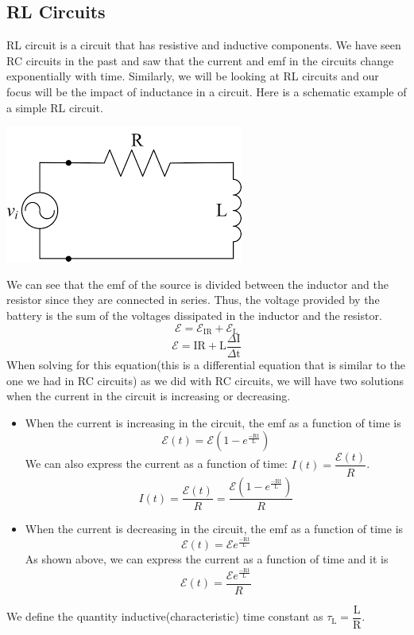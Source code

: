\documentclass[9pt]{article}
\begin{document}
	\subsection*{RL Circuits}
	RL circuit is a circuit that has resistive and inductive components. We have seen RC circuits in the past and saw that the current and emf in the circuits change exponentially with time. Similarly, we will be looking at RL circuits and our focus will be the impact of inductance in a circuit. Here is a schematic example of a simple RL circuit.
	\begin{center}
		\includegraphics[scale=0.5]{RL}
	\end{center}
	We can see that the emf of the source is divided between the inductor and the resistor since they are connected in series. Thus, the voltage provided by the battery is the sum of the voltages dissipated in the inductor and the resistor.
	$$\mathcal{E}=\mathcal{E}_{\text{IR}}+\mathcal{E}_{\text{L}}$$ 
	$$\mathcal{E}=\text{IR}+\text{L}\dfrac{\varDelta\text{I}}{\varDelta \text{t}}$$ 
	When solving for this equation(this is a differential equation that is similar to the one we had in RC circuits) as we did with RC circuits, we will have two solutions when the current in the circuit is increasing or decreasing.
	\begin{itemize}
		\item When the current is increasing in the circuit, the emf as a function of time is
		$$\mathcal{E}(t)=\mathcal{E}(1-e^{\frac{-\text{Rt}}{\text{L}}})$$
		We can also express the current as a function of time: $I(t)=\dfrac{\mathcal{E}(t)}{R}$.
		$$I(t)=\dfrac{\mathcal{E}(t)}{R}=\dfrac{\mathcal{E}(1-e^{\frac{-\text{Rt}}{\text{L}}})}{R}$$
		\item When the current is decreasing in the circuit, the emf as a function of time is
		$$\mathcal{E}(t)=\mathcal{E}e^{\frac{-\text{Rt}}{\text{L}}}$$
		As shown above, we can express the current as a function of time and it is
		$$\mathcal{E}(t)=\dfrac{\mathcal{E}e^{\frac{-\text{Rt}}{\text{L}}}}{R}$$
	\end{itemize}
	We define the quantity inductive(characteristic) time constant as $\tau_\text{L}=\dfrac{\text{L}}{\text{R}}$. \\ \\
\end{document}
